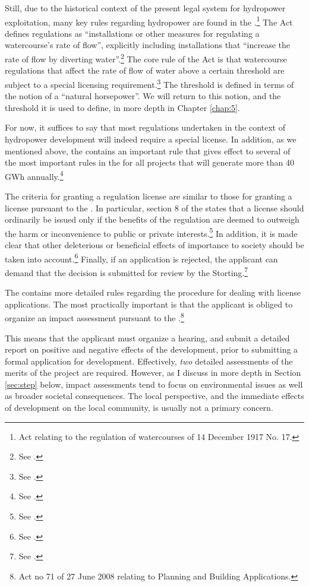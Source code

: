 Still, due to the historical context of the present legal system for hydropower exploitation, many key rules regarding hydropower are found in the \cite{wra17}.\footnote{Act relating to the regulation of watercourses of 14 December 1917 No. 17.} The Act defines regulations as ``installations or other measures for regulating a watercourse's rate of flow'', explicitly including installations that ``increase the rate of flow by diverting water''.\footnote{See \cite[1]{wra17}.} The core rule of the Act is that watercourse regulations that affect the rate of flow of water above a certain threshold are subject to a special licensing requirement.\footnote{See \cite[2]{wra17}.} The threshold is defined in terms of the notion of a ``natural horsepower''. We will return to this notion, and the threshold it is used to define, in more depth in Chapter \ref{chap:5}. 

For now, it suffices to say that most regulations undertaken in the context of hydropower development will indeed require a special license. In addition, as we mentioned above, the \cite{wra00} contains an important rule that gives effect to several of the most important rules in the \cite{wra17} for all projects that will generate more than 40 GWh annually.\footnote{See \cite[19]{wra00}.}

The criteria for granting a regulation license are similar to those for granting a license pursuant to the \cite{wra00}. In particular, section 8 of the \cite{wra17} states that a license should ordinarily be issued only if the benefits of the regulation are deemed to outweigh the harm or inconvenience to public or private interests.\footnote{See \cite[8]{wra17}.} In addition, it is made clear that other deleterious or beneficial effects of importance to society should be taken into account.\footnote{See \cite[8]{wra17}.} Finally, if an application is rejected, the applicant can demand that the decision is submitted for review by the Storting.\footnote{See \cite[8]{wra17}.}

The \cite{wra17} contains more detailed rules regarding the procedure for dealing with license applications. The most practically important is that the applicant is obliged to organize an impact assessment pursuant to the \cite{pb08}.\footnote{Act no 71 of 27 June 2008 relating to  Planning and Building Applications.}

This means that the applicant must organize a hearing, and submit a detailed report on positive and negative effects of the development, prior to submitting a formal application for development. Effectively, {\it two} detailed assessments of the merits of the project are required. However, as I discuss in more depth in Section \ref{sec:step} below, impact assessments tend to focus on environmental  issues as well as broader societal consequences. The local perspective, and the immediate effects of development on the local community, is usually not a primary concern.

